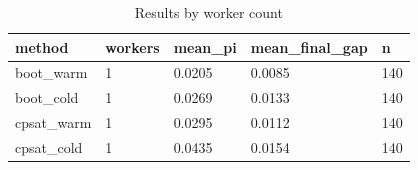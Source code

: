 \begin{table}[t]
\centering
\begin{tabular}{lllll}
\toprule
method & workers & mean\_pi & mean\_final\_gap & n \\
\midrule
boot\_warm & 1 & 0.0205 & 0.0085 & 140 \\
boot\_cold & 1 & 0.0269 & 0.0133 & 140 \\
cpsat\_warm & 1 & 0.0295 & 0.0112 & 140 \\
cpsat\_cold & 1 & 0.0435 & 0.0154 & 140 \\
\bottomrule
\end{tabular}
\caption{Results by worker count}
\label{tab:by-workers}
\end{table}
